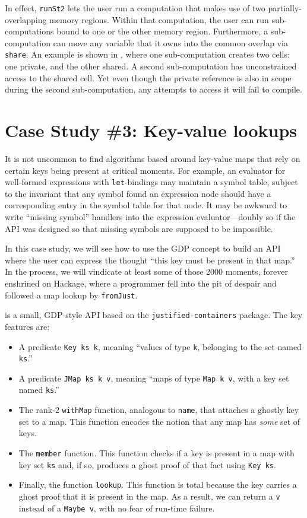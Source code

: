 \documentclass[format=sigplan, review=false, screen=true]{acmart}
\begin{document}
In effect, \texttt{runSt2} lets the user run a computation that makes use of
two partially-overlapping memory regions. Within that computation, the user
can run sub-computations bound to one or the other memory region. Furthermore,
a sub-computation can move any variable that it owns into the common overlap
via \texttt{share}. An example is shown in , where one sub-computation
creates two cells: one private, and the other shared. A second sub-computation has unconstrained
access to the shared cell. Yet even though the private reference is also in scope during
the second sub-computation, any attempts to access it will fail to compile.

\section{Case Study \#3: Key-value lookups}

It is not uncommon to find algorithms based around key-value maps that rely
on certain keys being present at critical moments. For example, an evaluator for
well-formed expressions with \texttt{let}-bindings may maintain a symbol table, subject to the
invariant that any symbol found an expression node should have a corresponding entry in the
symbol table for that node. It may be awkward to write ``missing symbol'' handlers into the expression
evaluator---doubly so if the API was designed so that missing symbols are supposed to
be impossible.

In this case study, we will see how to use the GDP concept to build an API where the
user can express the thought ``this key must be present in that map.''
In the process, we will vindicate at least some of those
2000 moments, forever enshrined on Hackage, where a programmer fell into
the pit of despair and followed a map lookup by \texttt{fromJust}.

 is a small, GDP-style API based on the \texttt{justified-containers}
package. The key features are:
\begin{itemize}
\item A predicate \texttt{Key ks k}, meaning ``values of type \texttt{k}, belonging to
  the set named \texttt{ks}.''
\item A predicate \texttt{JMap ks k v}, meaning ``maps of type \texttt{Map k v}, with
  a key set named \texttt{ks}.''
\item The rank-2 \texttt{withMap} function, analogous to \texttt{name}, that attaches
  a ghostly key set to a map. This function encodes the notion that any map has
  \emph{some} set of keys.
\item The \texttt{member} function. This function checks if a key is present in a map
  with key set \texttt{ks} and,
  if so, produces a ghost proof of that fact using \texttt{Key ks}.
\item Finally, the function \texttt{lookup}. This function is total because the
  key carries a ghost proof that it is present in the map. As a result, we can return
  a \texttt{v} instead of a \texttt{Maybe v}, with no fear of run-time failure.
\end{itemize}
\end{document}
